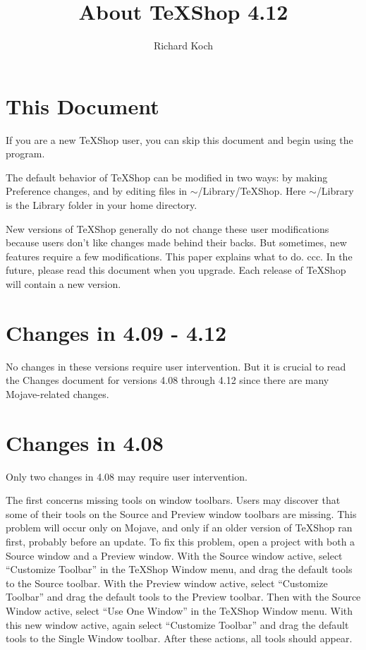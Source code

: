 \documentclass[11pt, oneside]{amsart}
\title{About TeXShop 4.12}
\author{Richard Koch}
\begin{document}
\maketitle

\thispagestyle{empty}
\vspace{-.3in}
\section{This Document}

If you are a new TeXShop user, you can skip this document and begin using the program.

The default behavior of TeXShop can be modified in two ways: by making Preference changes, and by editing files in $\sim$/Library/TeXShop. Here $\sim$/Library is the Library folder in your home directory. 

New versions of TeXShop generally do not change these user modifications because users don't like changes made behind their backs. But sometimes, new features require a few modifications. This paper explains what to do.
ccc.
In the future, please read this document when you upgrade. Each release of TeXShop will contain a new version.

\section{Changes in 4.09 - 4.12}

No changes in these versions require user intervention. But it is crucial to read the Changes document for versions 4.08 through 4.12 since there are many Mojave-related changes.

\section{Changes in 4.08}

Only two changes in 4.08 may require user intervention.

The first concerns missing tools on window toolbars. Users may discover that some of their tools on the Source and Preview window toolbars are missing. This problem will occur only on Mojave, and only if an older version of TeXShop ran first, probably before an update. To fix this problem, open a project with both a Source window and a Preview window. With the Source window active, select ``Customize Toolbar'' in the TeXShop Window menu, and drag the default tools to the Source toolbar. With the Preview window active, select ``Customize Toolbar'' and drag the default tools to the Preview toolbar. Then with the Source Window active, select ``Use One Window'' in the TeXShop Window menu. With this new window active, again select ``Customize Toolbar'' and drag the default tools to the Single Window toolbar. After these actions, all tools should appear.
\end{document}
